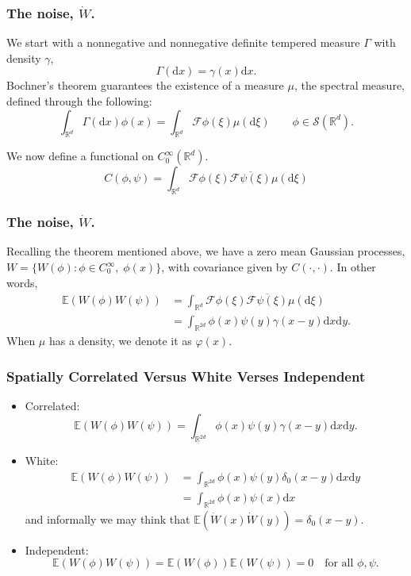 \documentclass{beamer}%
\numberwithin{equation}{section}
\newcommand{\R}{\mathbb{R}}
\newcommand{\ud}{\ensuremath{\mathrm{d} }}
\begin{document}
	\begin{frame}[t]
		\frametitle{The noise, $\dot{W}$.}
		We start with a nonnegative and nonnegative definite tempered measure $\Gamma$ with density $\gamma$,
		\[
		\Gamma(\ud x) = \gamma(x) \ud x.
		\]
		Bochner's theorem guarantees the existence of a measure $\mu$, the spectral measure, defined through the following:
		\[
		\int_{\R^d}\Gamma(\ud x) \phi(x) = \int_{\R^d} \mathcal{F}\phi(\xi) \mu(\ud \xi) \qquad \phi \in \mathscr{S}(\R^d).
		\]

	We now define a functional on $C_0^{\infty}(\R^d)$.
		\[
			C(\phi,\psi) =  \int_{\R^d} \mathcal{F}\phi(\xi) \overline{\mathcal{F}\psi(\xi)} \mu (\ud \xi)
		\]
	\end{frame}

\begin{frame}[t]
\frametitle{The noise, $\dot{W}$.}
Recalling the theorem mentioned above, we have a zero mean Gaussian processes,$W=\{ W(\phi) : \phi \in C_0^{\infty}, \; \phi(x)\}$, with covariance given by $C(\cdot,\cdot)$. In other words,
	\begin{align*}
		\mathbb{E}(W(\phi)W(\psi)) &= \int_{\R^d} \mathcal{F}\phi(\xi) \overline{\mathcal{F}\psi(\xi)} \mu (\ud \xi)
		\\ &= \int_{\R^{2d}} \phi(x)\psi(y) \gamma(x-y) \ud x \ud y.
	\end{align*}
When $\mu$ has a density, we denote it as $\varphi(x)$.
	\end{frame}

	\begin{frame}
		\frametitle{Spatially Correlated Versus White Verses Independent}
\begin{itemize}
	\item Correlated: \[\mathbb{E}(W(\phi)W(\psi))=\int_{\R^{2d}} \phi(x)\psi(y) \gamma(x-y) \ud x \ud y.\]
	\item White:
		\begin{align*}
			\mathbb{E}(W(\phi)W(\psi))&=\int_{\R^{2d}} \phi(x)\psi(y) \delta_0(x-y) \ud x \ud y
			\\&= \int_{\R^{2d}} \phi(x)\psi(x) \ud x
		\end{align*}
		and informally we may think that $\mathbb{E}(\dot{W}(x)\dot{W}(y)) = \delta_0(x-y)$.
	\item Independent: \[ \mathbb{E}(W(\phi)W(\psi)) = \mathbb{E}(W(\phi))\mathbb{E}(W(\psi)) =0 \quad \text{for all } \phi, \psi.\]
\end{itemize}
	\end{frame}
\end{document}
